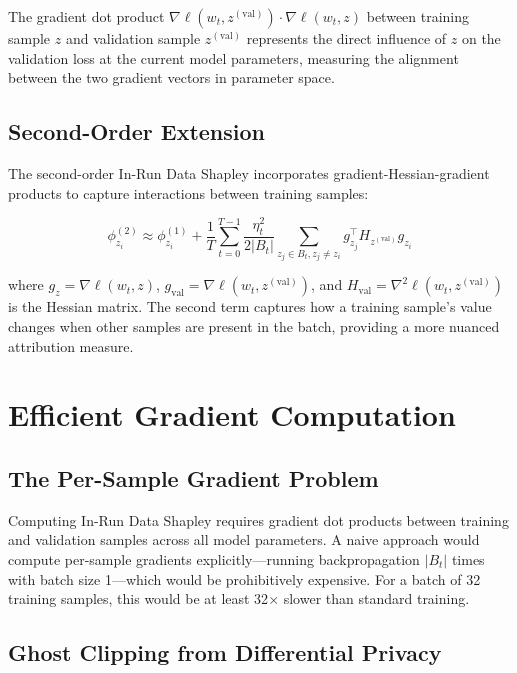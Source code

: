 \documentclass[12pt,a4paper]{report}
\begin{document}
The gradient dot product $\nabla\ell(w_t, z^{(\text{val})}) \cdot \nabla\ell(w_t, z)$ between training sample $z$ and validation sample $z^{(\text{val})}$ represents the direct influence of $z$ on the validation loss at the current model parameters, measuring the alignment between the two gradient vectors in parameter space.

\subsection{Second-Order Extension}
\label{sec:second_order}

The second-order In-Run Data Shapley incorporates gradient-Hessian-gradient products to capture interactions between training samples:

\begin{equation}
    \phi_{z_i}^{(2)} \approx \phi_{z_i}^{(1)} + \frac{1}{T} \sum_{t=0}^{T-1} \frac{\eta_t^2}{2|B_t|} \sum_{z_j \in B_t, z_j \neq z_i} g_{z_j}^\top H_{z^{(\text{val})}} g_{z_i}
    \label{eq:second_order_shapley}
\end{equation}

where $g_z = \nabla\ell(w_t, z)$, $g_{\text{val}} = \nabla\ell(w_t, z^{(\text{val})})$, and $H_{\text{val}} = \nabla^2\ell(w_t, z^{(\text{val})})$ is the Hessian matrix. The second term captures how a training sample's value changes when other samples are present in the batch, providing a more nuanced attribution measure.

\section{Efficient Gradient Computation}
\label{sec:efficient_grad}

\subsection{The Per-Sample Gradient Problem}
\label{sec:per_sample}

Computing In-Run Data Shapley requires gradient dot products between training and validation samples across all model parameters. A naive approach would compute per-sample gradients explicitly---running backpropagation $|B_t|$ times with batch size 1---which would be prohibitively expensive. For a batch of 32 training samples, this would be at least 32$\times$ slower than standard training.

\subsection{Ghost Clipping from Differential Privacy}
\label{sec:ghost_clipping}
\end{document}
